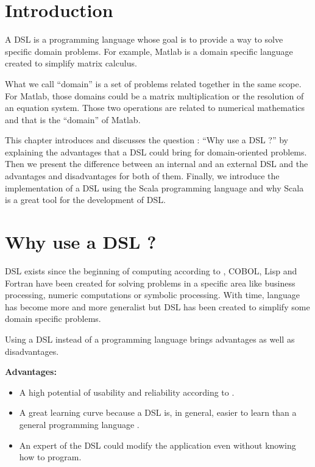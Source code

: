 
\section{Introduction}
\label{sec:dsl_intro}

A \gls{DSL} is a programming language whose goal is
to provide a way to solve specific domain problems. For example, Matlab is a
domain specific language created to simplify matrix calculus.

What we call ``domain'' is a set of problems related together in the same scope.
For Matlab, those domains could be a matrix multiplication or the resolution of an
equation system. Those two operations are related to numerical mathematics and
that is the ``domain'' of Matlab.

This chapter introduces and discusses the question : ``Why use a DSL ?'' by
explaining the advantages that a \gls{DSL} could bring for domain-oriented
problems. Then we present the difference between an internal and an external DSL
and the advantages and disadvantages for both of them. Finally, we introduce the
implementation of a \gls{DSL} using the Scala programming language and why Scala
is a great tool for the development of \gls{DSL}.

\section{Why use a DSL ?}
\label{sec:why-use-dsl}

\gls{DSL} exists since the beginning of computing according to
\cite{VanDeursen2000}, COBOL, Lisp and Fortran have been
created for solving problems in a specific area like business processing, numeric
computations or symbolic processing. With time, language has become more and
more generalist but \gls{DSL} has been created to simplify some domain
specific problems.

Using a DSL instead of a programming language brings advantages as well as
disadvantages.

\textbf{Advantages:}
\begin{itemize}
\item A high potential of usability and reliability according to
  \cite{Tolvanen2010}.
\item A great learning curve because a DSL is, in general, easier to learn than a
  general programming language \cite{Mernik2005}.
\item An expert of the DSL could modify the application even without knowing how
  to program.
\end{itemize}

